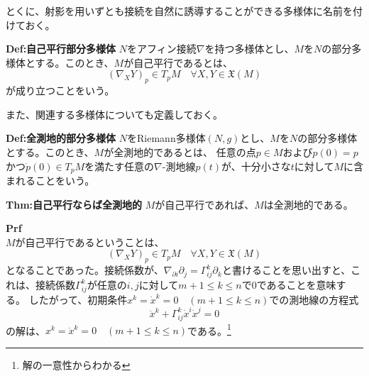 \documentclass[a4paper,11pt]{jsarticle}
\numberwithin{equation}{section}
\begin{document}
とくに、射影を用いずとも接続を自然に誘導することができる多様体に名前を付けておく。
\begin{itembox}[l]{\textbf{Def:自己平行部分多様体}}
    $N$をアフィン接続$\nabla$を持つ多様体とし、$M$を$N$の部分多様体とする。このとき、$M$が自己平行であるとは、
    \begin{equation}
        (\nabla_X Y)_p \in T_pM \quad \forall X,Y \in \mathfrak{X}(M)
    \end{equation}
    が成り立つことをいう。

\end{itembox}
また、関連する多様体についても定義しておく。

\begin{itembox}[l]{\textbf{Def:全測地的部分多様体}}
    $N$をRiemann多様体$(N,g)$とし、$M$を$N$の部分多様体とする。このとき、$M$が全測地的であるとは、
    任意の点$p \in M$および$p(0) =p$かつ$\dot{p}(0) \in T_pM$を満たす任意の$\nabla$-測地線$p(t)$が、十分小さな$t$に対して$M$に含まれることをいう。
\end{itembox}

\begin{itembox}[l]{\textbf{Thm:自己平行ならば全測地的}}
    $M$が自己平行であれば、$M$は全測地的である。
\end{itembox}
\textbf{Prf}\\
$M$が自己平行であるということは、
\begin{equation}
    (\nabla_X Y)_p \in T_pM \quad \forall X,Y \in \mathfrak{X}(M)
\end{equation}
となることであった。接続係数が、$\nabla_{\partial{i}}\partial_{j} = \Gamma_{ij}^k\partial_{k}$と書けることを思い出すと、これは、接続係数$\Gamma_{ij}^k$が任意の$i,j$に対して$m+1 \leq k \leq n$で$0$であることを意味する。
したがって、初期条件$x^k =\dot{x}^k = 0 \quad (m+1 \leq k \leq n)$での測地線の方程式
\begin{equation}
    \ddot{x}^k + \Gamma_{ij}^k \dot{x}^i \dot{x}^j = 0
\end{equation}
の解は、$x^k = \dot{x}^k = 0 \quad (m+1 \leq k \leq n)$である。\footnote{解の一意性からわかる}\hfill\qedsymbol
\end{document}
